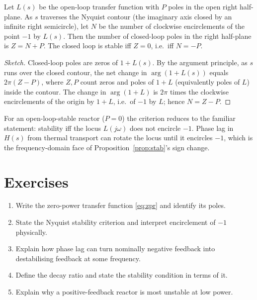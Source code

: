 \begin{theorem}[Nyquist]
\label{thm:nyquist}
Let $L(s)$ be the open-loop transfer function with $P$ poles in the open right
half-plane. As $s$ traverses the Nyquist contour (the imaginary axis closed by an
infinite right semicircle), let $N$ be the number of clockwise encirclements of
the point $-1$ by $L(s)$. Then the number of closed-loop poles in the right
half-plane is $Z=N+P$. The closed loop is stable iff $Z=0$, i.e.\ iff
$N=-P$.
\end{theorem}
\begin{proof}[Sketch]
Closed-loop poles are zeros of $1+L(s)$. By the argument principle, as $s$ runs
over the closed contour, the net change in $\arg(1+L(s))$ equals $2\pi(Z-P)$,
where $Z,P$ count zeros and poles of $1+L$ (equivalently poles of $L$) inside the
contour. The change in $\arg(1+L)$ is $2\pi$ times the clockwise encirclements of
the origin by $1+L$, i.e.\ of $-1$ by $L$; hence $N=Z-P$.
\end{proof}

For an open-loop-stable reactor ($P=0$) the criterion reduces to the familiar
statement: stability iff the locus $L(j\omega)$ does not encircle $-1$. Phase lag
in $H(s)$ from thermal transport can rotate the locus until it encircles $-1$,
which is the frequency-domain face of Proposition~\ref{prop:stab}'s sign change.


\section*{Exercises}
\begin{enumerate}[leftmargin=*,itemsep=2pt]
\item Write the zero-power transfer function \eqref{eq:zpr} and identify its poles.
\item State the Nyquist stability criterion and interpret encirclement of $-1$ physically.
\item Explain how phase lag can turn nominally negative feedback into destabilising feedback at some frequency.
\item Define the decay ratio and state the stability condition in terms of it.
\item Explain why a positive-feedback reactor is most unstable at low power.
\end{enumerate}
